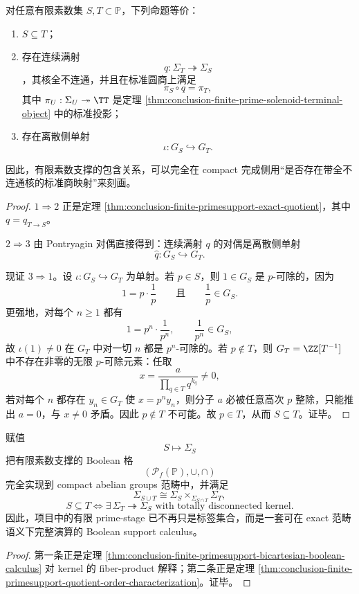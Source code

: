 \begin{theorem}[有限素数支撑包含关系的商映射判别]\label{thm:conclusion-finite-primesupport-quotient-order-characterization}
对任意有限素数集 \(S,T\subset \mathbb P\)，下列命题等价：
\begin{enumerate}
  \item \(S\subseteq T\)；
  \item 存在连续满射
  \[
  q:\Sigma_T\twoheadrightarrow \Sigma_S
  \]
  ，其核全不连通，并且在标准圆商上满足
  \[
  \pi_S\circ q=\pi_T,
  \]
  其中 \(\pi_U:\Sigma_U\twoheadrightarrow \TT\) 是定理 \ref{thm:conclusion-finite-prime-solenoid-terminal-object} 中的标准投影；
  \item 存在离散侧单射
  \[
  \iota:G_S\hookrightarrow G_T.
  \]
\end{enumerate}
因此，有限素数支撑的包含关系，可以完全在 compact 完成侧用“是否存在带全不连通核的标准商映射”来刻画。
\end{theorem}
\begin{proof}
\(1\Rightarrow 2\) 正是定理 \ref{thm:conclusion-finite-primesupport-exact-quotient}，其中 \(q=q_{T\to S}\)。

\(2\Rightarrow 3\) 由 Pontryagin 对偶直接得到：连续满射 \(q\) 的对偶是离散侧单射
\[
\widehat q:G_S\hookrightarrow G_T.
\]

现证 \(3\Rightarrow 1\)。设 \(\iota:G_S\hookrightarrow G_T\) 为单射。若 \(p\in S\)，则 \(1\in G_S\) 是 \(p\)-可除的，因为
\[
1=p\cdot \frac{1}{p}
\qquad\text{且}\qquad
\frac{1}{p}\in G_S.
\]
更强地，对每个 \(n\ge 1\) 都有
\[
1=p^n\cdot \frac{1}{p^n},
\qquad
\frac{1}{p^n}\in G_S,
\]
故 \(\iota(1)\neq 0\) 在 \(G_T\) 中对一切 \(n\) 都是 \(p^n\)-可除的。若 \(p\notin T\)，则 \(G_T=\ZZ[T^{-1}]\) 中不存在非零的无限 \(p\)-可除元素：任取
\[
x=\frac{a}{\prod_{q\in T}q^{k_q}}\neq 0,
\]
若对每个 \(n\) 都存在 \(y_n\in G_T\) 使 \(x=p^n y_n\)，则分子 \(a\) 必被任意高次 \(p\) 整除，只能推出 \(a=0\)，与 \(x\neq 0\) 矛盾。因此 \(p\notin T\) 不可能。故 \(p\in T\)，从而 \(S\subseteq T\)。证毕。
\end{proof}

\begin{corollary}\label{cor:conclusion-finite-primesupport-boolean-exact-realization}
赋值
\[
S\longmapsto \Sigma_S
\]
把有限素数支撑的 Boolean 格
\[
(\mathcal P_f(\mathbb P),\cup,\cap)
\]
完全实现到 compact abelian groups 范畴中，并满足
\[
\Sigma_{S\cup T}
\cong
\Sigma_S\times_{\Sigma_{S\cap T}}\Sigma_T,
\]
\[
S\subseteq T
\iff
\exists\,\Sigma_T\twoheadrightarrow \Sigma_S
\text{ with totally disconnected kernel}.
\]
因此，项目中的有限 prime-stage 已不再只是标签集合，而是一套可在 exact 范畴语义下完整演算的 Boolean support calculus。
\end{corollary}
\begin{proof}
第一条正是定理 \ref{thm:conclusion-finite-primesupport-bicartesian-boolean-calculus} 对 kernel 的 fiber-product 解释；第二条正是定理 \ref{thm:conclusion-finite-primesupport-quotient-order-characterization}。证毕。
\end{proof}

